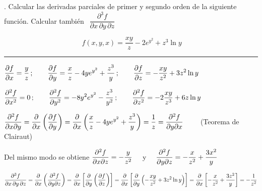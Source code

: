 \vspace{1cm}
\begin{miejercicio}
.	Calcular las derivadas parciales de primer y segundo orden de la siguiente función. 
Calcular también $\ \ \displaystyle \dfrac{\partial^3 f}{\partial x \, \partial y \, \partial z}$	

$$\ f(x,y,x)=\dfrac{xy}{z}-2e^{y^2}+z^3\ln y$$

\color{teal!80}
\rule{200pt}{0.2pt}
\color{black}
\vspace{5mm}

$\displaystyle \pdv{f}{x}=\dfrac y z \, ; \qquad \pdv{f}{y}=\frac x z -4ye^{y^2} + \dfrac{z^3}{y}\, ; \qquad\pdv{f}{z}=-\dfrac{xy}{z^2}+3z^2\ln y$

\vspace{3mm} $\displaystyle \pdv[2]{f}{x}=0 \, ; \qquad \pdv[2]{f}{y}= -8y^2e^{y^2} - \dfrac{z^3}{y^2}\, ; \qquad\pdv[2]{f}{z}=-2\dfrac{xy}{z^3}+6z\ln y$

\vspace{3mm} $\displaystyle \pdv[2]{f}{x}{y}=\pdv{x}\left( \pdv{f}{y} \right) = \pdv{x}\left( \frac x z -4ye^{y^2} + \dfrac{z^3}{y} \right) = \dfrac 1 z = \pdv[2]{f}{y}{x} \qquad$ \textcolor{gris}{(Teorema de Clairaut)} 

\vspace{3mm} Del mismo modo se obtiene $\displaystyle \pdv[2]{f}{x}{z}=-\dfrac y{z^2} \quad $ y $\quad \displaystyle \pdv[2]{f}{y}{z}=-\dfrac x{z^2}+\dfrac{3x^2}y$

\vspace{3mm} \begin{small}$\displaystyle \dfrac{\partial^3 f}{\partial x \, \partial y \, \partial z}=
\pdv{x} \left( \pdv[2]{f}{y}{z} \right) =
\pdv{x} \left[ \pdv{y} \left(  \pdv{f}{z} \right) \right]=
\pdv{x} \left[ \pdv{y} \left(  -\dfrac{xy}{z^2}+3z^2\ln y \right) \right]=
\pdv{x} \left[ -\dfrac{x}{z^2}+\dfrac{3z^2}{y} \right]=-\dfrac 1{z^2}$\end{small}	

\end{miejercicio}


